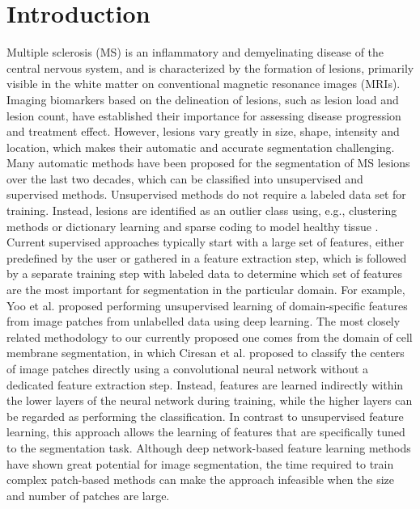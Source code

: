 \section{Introduction}

Multiple sclerosis (MS) is an inflammatory and demyelinating disease of the
central nervous system, and is characterized by the formation of lesions,
primarily visible in the white matter on conventional magnetic resonance images
(MRIs). Imaging biomarkers based on the delineation of lesions, such as lesion
load and lesion count, have established their importance for assessing disease
progression and treatment effect. However, lesions vary greatly in size, shape,
intensity and location, which makes their automatic and accurate segmentation
challenging. Many automatic methods have been proposed for the segmentation of
MS \mbox{lesions} over the last two decades, which can be classified into
unsupervised and supervised methods. Unsupervised methods do not require a labeled data set
for training. Instead, lesions are identified as an outlier class using, e.g.,
clustering methods \cite{souplet2008} or dictionary learning and sparse coding
to model healthy tissue \cite{weiss2013}. Current supervised approaches
typically start with a large set of features, either predefined by the user
\cite{geremia2010} or gathered in a feature extraction step, which is followed
by a separate training step with labeled data to determine which set of features
are the most important for segmentation in the particular domain. For example,
Yoo et al. \cite{yoo2014} proposed performing unsupervised learning of
domain-specific features from image patches from unlabelled data using deep
learning. The most closely related methodology to our currently proposed one
comes from the domain of cell membrane segmentation, in which Ciresan et al.
\cite{Ciresan2012} proposed to classify the centers of image patches directly
using a convolutional neural network \cite{LeCun1998} without a dedicated
feature extraction step. Instead, features are learned indirectly within the
lower layers of the neural network during training, while the higher layers can
be regarded as performing the classification. In contrast to unsupervised
feature learning, this approach allows the learning of features that are
specifically tuned to the segmentation task. Although deep network-based feature
learning methods have shown great potential for image segmentation, the time
required to train complex patch-based methods can make the approach infeasible
when the size and number of patches are large.

